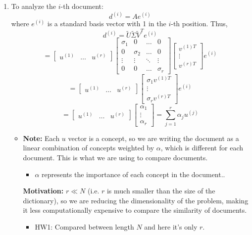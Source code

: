 \begin{example}
\begin{enumerate}
        \item To analyze the \( i \)-th document:
        \[
        d^{(i)} = A e^{(i)} 
        \]
        where \( e^{(i)} \) is a standard basis vector with 1 in the \( i \)-th position. Thus,
        \[
        d^{(i)} = \tilde{U} \tilde{\Sigma} \tilde{V}^T e^{(i)}
        \]
        \[
        = \begin{bmatrix} u^{(1)} & \ldots & u^{(r)} \end{bmatrix}
        \begin{bmatrix}
        \sigma_1 & 0 & \ldots & 0 \\
        0 & \sigma_2 & \ldots & 0 \\
        \vdots & \vdots & \ddots & \vdots \\
        0 & 0 & \ldots & \sigma_r
        \end{bmatrix}
        \begin{bmatrix} v^{(1)T} \\ \vdots \\ v^{(r)T} \end{bmatrix} e^{(i)}
        \]
        \[
        = \begin{bmatrix} u^{(1)} & \ldots & u^{(r)} \end{bmatrix}
        \begin{bmatrix} \sigma_1 v^{(1)T} \\ \vdots \\ \sigma_r v^{(r)T} \end{bmatrix} e^{(i)}
        \]
        \[
        = \begin{bmatrix} u^{(1)} & \ldots & u^{(r)} \end{bmatrix}
        \begin{bmatrix} \alpha_1 \\ \vdots \\ \alpha_r \end{bmatrix}
        = \sum_{j=1}^{r} \alpha_j u^{(j)}
        \]
        \begin{itemize}
            \item \textbf{Note:} Each $u$ vector is a concept, so we are writing the document as a linear combination of concepts weighted by $\alpha$, which is different for each document. This is what we are using to compare documents.
            \begin{itemize}
                \item $\alpha$ represents the importance of each concept in the document..
            \end{itemize}
            \textbf{Motivation:} $r \ll N$ (i.e. $r$ is much smaller than the size of the dictionary), so we are reducing the dimensionality of the problem, making it less computationally expensive to compare the similarity of documents. 
            \begin{itemize}
                \item HW1: Compared between length $N$ and here it's only $r$.
            \end{itemize}
        \end{itemize}
    

\end{enumerate}
\end{example}
